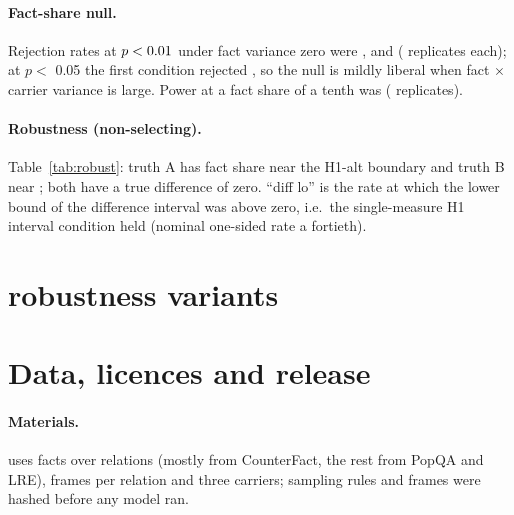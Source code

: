 \paragraph{Fact-share null.}
Rejection rates at $p<0.01$ under fact variance zero were \ptCalFcOneNcThreeRejOne, \ptCalFcQuarterNcThreeRejOne{} and \ptCalFcOneNcTwoRejOne{} (\ptCalFcOneNcThreeN{} replicates each); at $p<$ 0.05 the first condition rejected \ptCalFcOneNcThreeRejFive{}, so the null is mildly liberal when fact $\times$ carrier variance is large. %
Power at a fact share of a tenth was \ptCalPowerRejOne{} (\ptCalPowerN{} replicates).
\paragraph{Robustness (non-selecting).}
Table~\ref{tab:robust}: truth A has fact share near the H1-alt boundary and truth B near \ptRuleAltIccLo; both have a true difference of zero. ``diff lo'' is the rate at which the lower bound of the difference interval was above zero, i.e.\ the single-measure H1 interval condition held (nominal one-sided rate a fortieth).
\begin{table}[h]
\centering\small
\setlength{\tabcolsep}{3pt} %

\caption{Robustness simulation (\ptRobNSim{} datasets per condition, \ptRobNBoot{} bootstrap resamples each).}
\label{tab:robust}
\end{table}

\FloatBarrier
\FloatBarrier
\FloatBarrier
\section{\SOne robustness variants}
\label{app:hrvar}
\begin{table}[h]
\centering\small
\setlength{\tabcolsep}{2pt} %

\caption{Preregistered \SOne robustness variants and secondary outcomes (non-gating). MISSING marks variants that could not be fitted.}
\end{table}

\FloatBarrier
\section{Data, licences and release}
\label{app:data}
\paragraph{Materials.}
\STwo uses \ptNFacts{} facts over \ptNRelations{} relations (mostly from CounterFact, the rest from PopQA and LRE), \ptNFrames{} frames per relation and three carriers; sampling rules and frames were hashed before any model ran.
